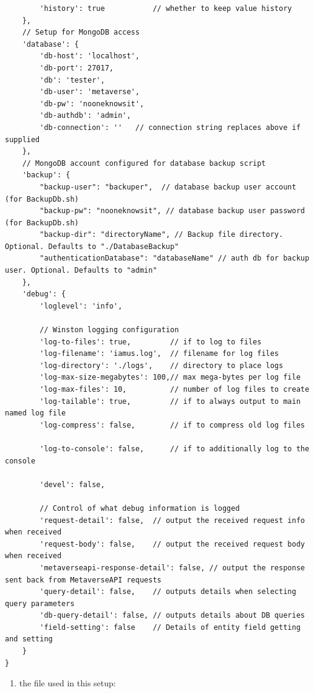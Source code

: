 \begin{verbatim}
        'history': true           // whether to keep value history
    },
    // Setup for MongoDB access
    'database': {
        'db-host': 'localhost',
        'db-port': 27017,
        'db': 'tester',
        'db-user': 'metaverse',
        'db-pw': 'nooneknowsit',
        'db-authdb': 'admin',
        'db-connection': ''   // connection string replaces above if supplied
    },
    // MongoDB account configured for database backup script
    'backup': {
        "backup-user": "backuper",  // database backup user account (for BackupDb.sh)
        "backup-pw": "nooneknowsit", // database backup user password (for BackupDb.sh)
        "backup-dir": "directoryName", // Backup file directory. Optional. Defaults to "./DatabaseBackup"
        "authenticationDatabase": "databaseName" // auth db for backup user. Optional. Defaults to "admin"
    },
    'debug': {
        'loglevel': 'info',

        // Winston logging configuration
        'log-to-files': true,         // if to log to files
        'log-filename': 'iamus.log',  // filename for log files
        'log-directory': './logs',    // directory to place logs
        'log-max-size-megabytes': 100,// max mega-bytes per log file
        'log-max-files': 10,          // number of log files to create
        'log-tailable': true,         // if to always output to main named log file
        'log-compress': false,        // if to compress old log files

        'log-to-console': false,      // if to additionally log to the console

        'devel': false,

        // Control of what debug information is logged
        'request-detail': false,  // output the received request info when received
        'request-body': false,    // output the received request body when received
        'metaverseapi-response-detail': false, // output the response sent back from MetaverseAPI requests
        'query-detail': false,    // outputs details when selecting query parameters
        'db-query-detail': false, // outputs details about DB queries
        'field-setting': false    // Details of entity field getting and setting
    }
}
\end{verbatim}

\begin{enumerate}
\def\labelenumi{\arabic{enumi})}
\setcounter{enumi}{2}
\tightlist
\item
  the file used in this setup:
\end{enumerate}

